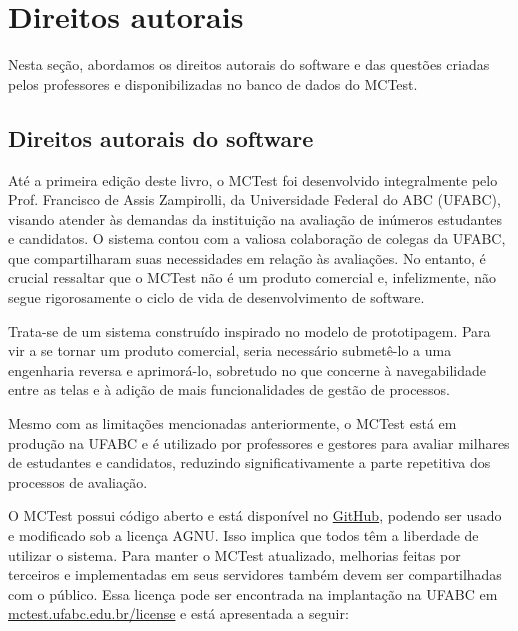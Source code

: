 \section{Direitos autorais}

Nesta seção, abordamos os direitos autorais do software e das  questões criadas pelos professores e disponibilizadas no banco de dados do MCTest.

\subsection{Direitos autorais do software}

Até a primeira edição deste livro, o MCTest foi desenvolvido integralmente pelo Prof. Francisco de Assis Zampirolli, da Universidade Federal do ABC (UFABC), visando atender às demandas da instituição na avaliação de inúmeros estudantes e candidatos. O sistema contou com a valiosa colaboração de colegas da UFABC, que compartilharam suas necessidades em relação às avaliações. No entanto, é crucial ressaltar que o MCTest não é um produto comercial e, infelizmente, não segue rigorosamente o ciclo de vida de desenvolvimento de software.

Trata-se de um sistema construído inspirado no modelo de prototipagem. Para vir a se tornar um produto comercial, seria necessário submetê-lo a uma engenharia reversa e aprimorá-lo, sobretudo no que concerne à navegabilidade entre as telas e à adição de mais funcionalidades de gestão de processos. 

Mesmo com as limitações mencionadas anteriormente, o MCTest está em produção na UFABC e é utilizado por professores e gestores para avaliar milhares de estudantes e candidatos, reduzindo significativamente a parte repetitiva dos processos de avaliação.

O MCTest possui código aberto e está disponível no \href{https://github.com/fzampirolli/mctest}{GitHub}, podendo ser usado e modificado sob a licença AGNU. Isso implica que todos têm a liberdade de utilizar o sistema. Para manter o MCTest atualizado, melhorias feitas por terceiros e implementadas em seus servidores também devem ser compartilhadas com o público. Essa licença pode ser encontrada na implantação na UFABC em \href{http://mctest.ufabc.edu.br/license}{mctest.ufabc.edu.br/license} e está apresentada a seguir:

